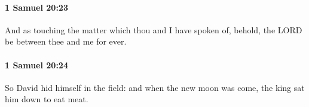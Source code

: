 		\paragraph{1 Samuel 20:23} %
			\label{1SAMUEL-20-23}

			And as touching the matter which thou and I have spoken of, behold, the LORD be between thee and me for ever.


		\paragraph{1 Samuel 20:24} %
			\label{1SAMUEL-20-24}

			So David hid himself in the field: and when the new moon was come, the king sat him down to eat meat.


